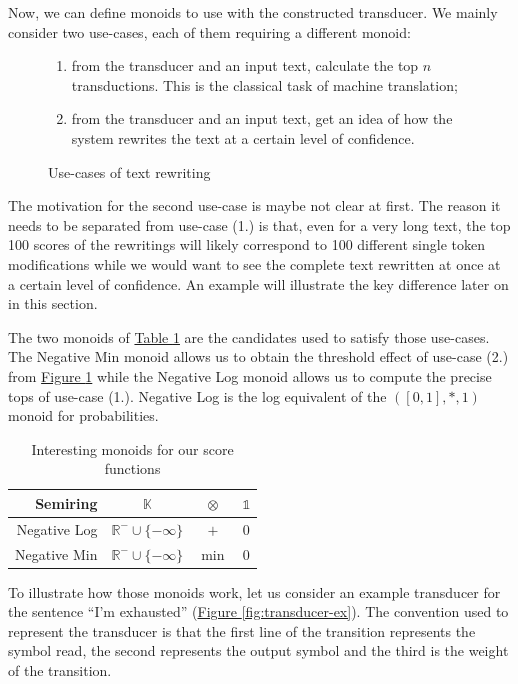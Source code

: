 \documentclass[a4paper, 11pt, onepage]{scrreprt}
\newcommand\tableref[1]{\hyperref[#1]{Table \ref*{#1}}}
\newcommand\figureref[1]{\hyperref[#1]{Figure \ref*{#1}}}
\begin{document}
Now, we can define monoids to use with the constructed transducer. We
mainly consider two use-cases, each of them requiring a different
monoid:

\begin{figure}[H]
  \centering
  \begin{enumerate}
  \item from the transducer and an input text, calculate the top $n$
    transductions. This is the classical task of machine translation;
  \item from the transducer and an input text, get an idea of how the
    system rewrites the text at a certain level of confidence.
  \end{enumerate}
  \caption{Use-cases of text rewriting}
\label{fig:use-cases}
\end{figure}

The motivation for the second use-case is maybe not clear at
first. The reason it needs to be separated from use-case (1.) is that,
even for a very long text, the top 100 scores of the rewritings will
likely correspond to 100 different single token modifications while we
would want to see the complete text rewritten at once at a certain
level of confidence. An example will illustrate the key difference
later on in this section.

The two monoids of \tableref{tab:monoids} are the candidates used to
satisfy those use-cases. The Negative Min monoid allows us to obtain
the threshold effect of use-case (2.) from \figureref{fig:use-cases}
while the Negative Log monoid allows us to compute the precise tops of
use-case (1.). Negative Log is the log equivalent of the $(\left[0,
  1\right], *, 1)$ monoid for probabilities.

\begin{table}[H]
  \centering
  \caption{Interesting monoids for our score functions}
  \begin{tabular}{rccc}
    \toprule
    Semiring & $\mathbb{K}$ & $\otimes$ & $\mathbb{1}$ \\
    \midrule
    Negative Log & $\mathbb{R}^{-} \cup \{-\infty\}$ & $+$ & $0$ \\
    Negative Min & $\mathbb{R}^{-} \cup \{-\infty\}$ & $\min$ & $0$ \\
  \end{tabular}
  \label{tab:monoids}
\end{table}

To illustrate how those monoids work, let us consider an example
transducer for the sentence “I'm exhausted”
(\figureref{fig:transducer-ex}). The convention used to represent the
transducer is that the first line of the transition represents the
symbol read, the second represents the output symbol and the third is
the weight of the transition.
\end{document}
